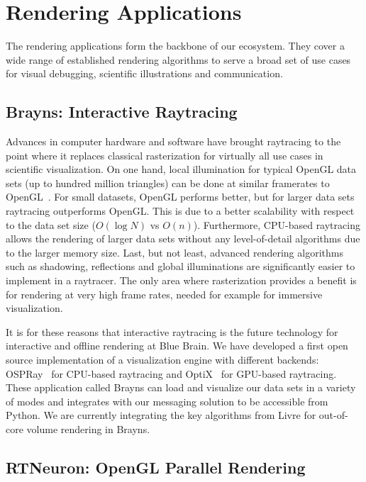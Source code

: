 \documentclass[10pt]{llncs}
\newcommand{\FIXME}[1]{\textbf{\color{BLUE}{FIXME: #1}}}
\begin{document}
\section{Rendering Applications}

The rendering applications form the backbone of our ecosystem. They cover a
wide range of established rendering algorithms to serve a broad set of use
cases for visual debugging, scientific illustrations and communication.

\subsection{Brayns: Interactive Raytracing}

Advances in computer hardware and software have brought raytracing to the point
where it replaces classical rasterization for virtually all use cases in
scientific visualization. On one hand, local illumination for typical OpenGL
data sets (up to hundred million triangles) can be done at similar framerates
to OpenGL~\cite{ospray}. For small datasets, OpenGL performs better, but for
larger data sets raytracing outperforms OpenGL. This is due to a better
scalability with respect to the data set size ($O(\log{N})$ vs $O(n)$).
Furthermore, CPU-based raytracing allows the rendering of larger data sets
without any level-of-detail algorithms due to the larger memory size. Last, but
not least, advanced rendering algorithms such as shadowing, reflections and
global illuminations are significantly easier to implement in a raytracer. The
only area where rasterization provides a benefit is for rendering at very high
frame rates, needed for example for immersive visualization.

It is for these reasons that interactive raytracing is the future technology for
interactive and offline rendering at Blue Brain. We have developed a first open
source implementation of a visualization engine with different backends:
OSPRay~\cite{ospray} for CPU-based raytracing and OptiX~\cite{optix} for
GPU-based raytracing. These application called Brayns can load and visualize
our data sets in a variety of modes and integrates with our messaging solution
to be accessible from Python. We are currently integrating the key algorithms
from Livre for out-of-core volume rendering in Brayns.

\FIXME{teaser gallery}

\subsection{RTNeuron: OpenGL Parallel Rendering}
\end{document}
